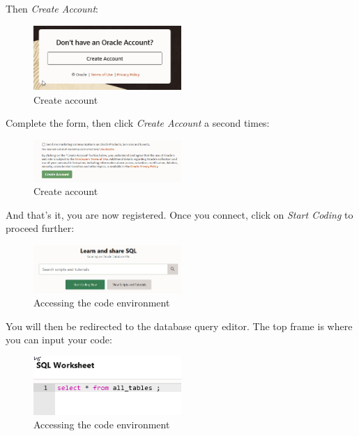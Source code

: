 \documentclass[12pt, letterpaper]{report}
\begin{document}
Then \textit{Create Account}:

\begin{figure}[H]
	\centering
	\includegraphics[width=0.5\textwidth]{livesql_create_account_01}
	\caption{Create account}
\end{figure}

Complete the form, then click \textit{Create Account} a second times:

\begin{figure}[H]
	\centering
	\includegraphics[width=0.5\textwidth]{livesql_create_account_02}
	\caption{Create account}
\end{figure}

And that's it, you are now registered.
Once you connect, click on \textit{Start Coding} to proceed further:

\begin{figure}[H]
	\centering
	\includegraphics[width=0.5\textwidth]{livesql_start_coding}
	\caption{Accessing the code environment}
\end{figure}

You will then be redirected to the database query editor.
The top frame is where you can input your code:

\begin{figure}[H]
	\centering
	\includegraphics[width=0.5\textwidth]{livesql_code}
	\caption{Accessing the code environment}
\end{figure}
\end{document}
